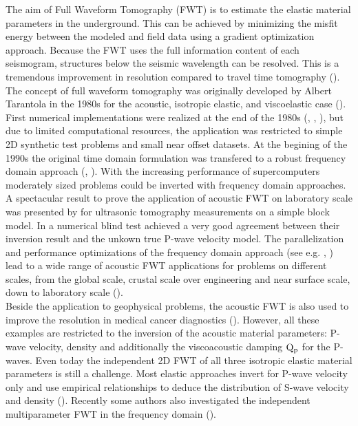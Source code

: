 The aim of Full Waveform Tomography (FWT) is to estimate the elastic material parameters in the underground. This can be achieved by minimizing the misfit energy 
between the modeled and field data using a gradient optimization approach. Because the FWT uses the full information content of each seismogram, structures below the seismic 
wavelength can be resolved. This is a tremendous improvement in resolution compared to travel time tomography (\cite{prattgao:2002}).\\ 
The concept of full waveform tomography was originally developed by Albert Tarantola in the  1980s  for the acoustic, isotropic elastic, and 
viscoelastic case (\cite{tarantola:84a,tarantola:84,tarantola:86,tarantola:88}). First numerical implementations were realized at the end of the 1980s 
(\cite{gauthier:86}, \cite{mora:87}, \cite{pica:90}), but due to limited computational resources, the application was restricted to simple 
2D synthetic test problems and small near offset datasets. At the begining of the 1990s the original time domain formulation was transfered 
to a robust frequency domain approach (\cite{prattworth:90}, \cite{pratt:90}). With the increasing performance of supercomputers moderately 
sized problems could be inverted with frequency domain approaches.\\ A spectacular result to prove the application of acoustic FWT on laboratory scale was presented by \cite{pratt:99} for ultrasonic tomography measurements on a simple block model. In a numerical blind test \cite{brenders:2007} achieved a very good agreement between their inversion result and the unkown true P-wave velocity model. The parallelization and performance optimizations of the frequency domain approach (see e.g. \cite{sourbier:09}, \cite{sourbier:09b}) lead to a wide range of acoustic FWT applications for problems on different scales, from the global scale, crustal scale over engineering and near surface scale, down to laboratory scale (\cite{pratt:2004}).\\ Beside the application to geophysical problems, the acoustic FWT is also used to improve the resolution in medical cancer diagnostics (\cite{pratt:2007}). However, all these examples are restricted to the inversion of the acoustic material parameters: P-wave velocity, density and additionally the viscoacoustic damping $\rm{Q_p}$ for the P-waves. Even today the independent 2D FWT of all three isotropic elastic material parameters is still a challenge. Most elastic approaches invert for P-wave velocity only and use empirical relationships to deduce the distribution of S-wave velocity and density (\cite{shipp:02,sheen:06}). Recently some authors also investigated the independent multiparameter FWT in the frequency domain (\cite{choi:2008,choi:2008a,brossier:2009}).  

